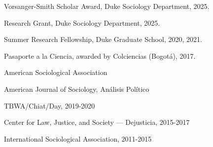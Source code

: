 \documentclass[11pt,article,oneside]{memoir}
\begin{document}
\ind Vorsanger-Smith Scholar Award, Duke Sociology Department, 2025.

\ind Research Grant, Duke Sociology Department, 2025.

\ind Summer Research Fellowship, Duke Graduate School, 2020, 2021.

\ind Pasaporte a la Ciencia, awarded by Colciencias (Bogotá), 2017.

\bigskip


\medskip

\ind {} American Sociological Association\par

\ind {} American Journal of Sociology, Análisis Político\par

\bigskip

\medskip

\ind {} TBWA/Chiat/Day, 2019-2020

\ind {} Center for Law, Justice, and Society — Dejusticia, 2015-2017

\ind {} International Sociological Association, 2011-2015
\end{document}
